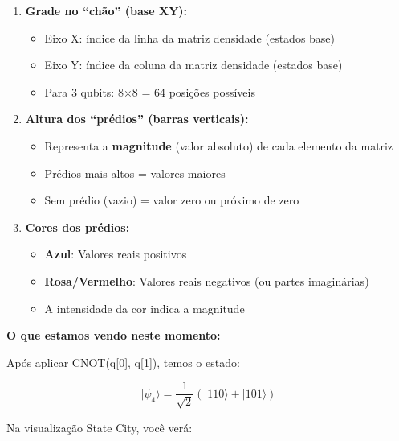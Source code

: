 \documentclass[
  brazilian,
]{report}
\providecommand{\tightlist}{%
  \setlength{\itemsep}{0pt}\setlength{\parskip}{0pt}}
\begin{document}
\begin{enumerate}
\def\labelenumi{\arabic{enumi}.}
\tightlist
\item
  \textbf{Grade no ``chão'' (base XY):}

  \begin{itemize}
  \tightlist
  \item
    Eixo X: índice da linha da matriz densidade (estados base)
  \item
    Eixo Y: índice da coluna da matriz densidade (estados base)
  \item
    Para 3 qubits: 8×8 = 64 posições possíveis
  \end{itemize}
\item
  \textbf{Altura dos ``prédios'' (barras verticais):}

  \begin{itemize}
  \tightlist
  \item
    Representa a \textbf{magnitude} (valor absoluto) de cada elemento da
    matriz
  \item
    Prédios mais altos = valores maiores
  \item
    Sem prédio (vazio) = valor zero ou próximo de zero
  \end{itemize}
\item
  \textbf{Cores dos prédios:}

  \begin{itemize}
  \tightlist
  \item
    \textbf{Azul}: Valores reais positivos
  \item
    \textbf{Rosa/Vermelho}: Valores reais negativos (ou partes
    imaginárias)
  \item
    A intensidade da cor indica a magnitude
  \end{itemize}
\end{enumerate}

\textbf{O que estamos vendo neste momento:}

Após aplicar CNOT(q{[}0{]}, q{[}1{]}), temos o estado:

\[|\psi_4\rangle = \frac{1}{\sqrt{2}}(|110\rangle + |101\rangle)\]

Na visualização State City, você verá:
\end{document}
